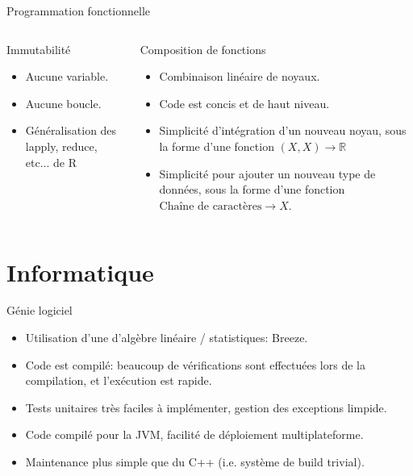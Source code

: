 \documentclass{beamer}
\begin{document}
\begin{frame}{Programmation fonctionnelle}
	\begin{columns}
		\begin{column}{0.45\textwidth}
			\begin{block}{Immutabilité}
				\begin{itemize}
					\item Aucune variable.
					\item Aucune boucle.
					\item Généralisation des lapply, reduce, etc... de R
				\end{itemize}
			\end{block}
		\end{column}
		\begin{column}{0.45\textwidth}
			\begin{block}{Composition de fonctions}
				\begin{itemize}
					\item Combinaison linéaire de noyaux.
					\item Code est concis et de haut niveau.
					\item Simplicité d'intégration d'un nouveau noyau, sous la forme d'une fonction $(X, X) \rightarrow \mathbb{R}$
					\item Simplicité pour ajouter un nouveau type de données, sous la forme d'une fonction $\text{Chaîne de caractères} \rightarrow X$.
				\end{itemize}
			\end{block}
		\end{column}
	\end{columns}
\end{frame}

\section{Informatique}

\begin{frame}{Génie logiciel}
	\begin{itemize}
		\item Utilisation d'une d'algèbre linéaire / statistiques: Breeze.
		\item Code est compilé: beaucoup de vérifications sont effectuées lors de la compilation, et l'exécution est rapide.
		\item Tests unitaires très faciles à implémenter, gestion des exceptions limpide.
		\item Code compilé pour la JVM, facilité de déploiement multiplateforme.
		\item Maintenance plus simple que du C++ (i.e. système de build trivial).
	\end{itemize}
\end{frame}
\end{document}
